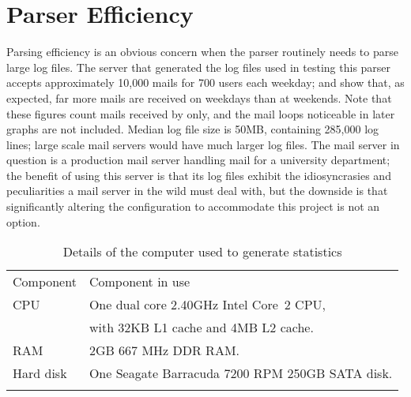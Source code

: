 \section{Parser Efficiency}

\label{parser efficiency}

Parsing efficiency is an obvious concern when the parser routinely needs to
parse large log files.  The server that generated the log files used in
testing this parser accepts approximately 10,000 mails for 700 users each
weekday;  and  show that, as expected, far more mails are
received on weekdays than at weekends.  Note that these figures count mails
received by  only, and the mail loops noticeable in later
graphs are not included.  Median log file size is 50MB, containing 285,000
log lines; large scale mail servers would have much larger log files.  The
mail server in question is a production mail server handling mail for a
university department; the benefit of using this server is that its log
files exhibit the idiosyncrasies and peculiarities a mail server in the
wild must deal with, but the downside is that significantly altering the
configuration to accommodate this project is not an option.



\begin{table}[thbp]
    \caption{Details of the computer used to generate statistics}
    \empty{}\label{Details of the computer used to generate statistics}
    \centering{}
    \begin{tabular}[]{ll}
        \tabletopline{}%
        Component  & Component in use                                   \\
        \tablemiddleline{}%
        CPU         & One dual core 2.40GHz Intel\textregistered{}
                        Core\texttrademark{}~2 CPU,                     \\
                    & with 32KB L1 cache and 4MB L2 cache.              \\
        RAM         & 2GB 667 MHz DDR RAM\@.                            \\
        Hard disk   & One Seagate Barracuda 7200 RPM 250GB SATA disk.   \\
        \tablebottomline{}%
    \end{tabular}
\end{table}

